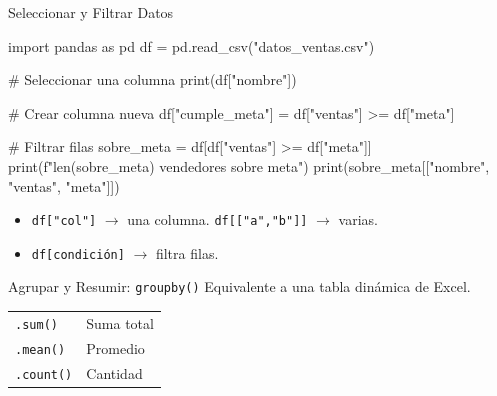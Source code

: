\documentclass[aspectratio=169, 11pt]{beamer}
\begin{document}
\begin{frame}[fragile,shrink=28]{Seleccionar y Filtrar Datos}
  \vspace{-6pt}
  \begin{pyblock}
import pandas as pd
df = pd.read_csv("datos_ventas.csv")

# Seleccionar una columna
print(df["nombre"])

# Crear columna nueva
df["cumple_meta"] = df["ventas"] >= df["meta"]

# Filtrar filas
sobre_meta = df[df["ventas"] >= df["meta"]]
print(f"{len(sobre_meta)} vendedores sobre meta")
print(sobre_meta[["nombre", "ventas", "meta"]])
  \end{pyblock}

  \vspace{4pt}
  {\scriptsize\color{textMuted}
  \begin{itemize}\setlength{\itemsep}{3pt}
    \item[{\color{arcaRed}\scriptsize\faArrowRight}]
      \texttt{df["col"]} $\to$ una columna.
      \texttt{df[["a","b"]]} $\to$ varias.
    \item[{\color{arcaRed}\scriptsize\faArrowRight}]
      \texttt{df[condición]} $\to$ filtra filas.
  \end{itemize}
  }
\end{frame}

\begin{frame}[fragile,shrink=28]{Agrupar y Resumir: \texttt{groupby()}}
  \vspace{-6pt}
  {\footnotesize
    Equivalente a una tabla dinámica de Excel.}

  \vspace{4pt}

  \vspace{4pt}
  {\scriptsize
  \begin{tabular}{@{}ll@{}}
    \texttt{.sum()} & Suma total \\
    \texttt{.mean()} & Promedio \\
    \texttt{.count()} & Cantidad \\
  \end{tabular}
  }
\end{frame}
\end{document}
